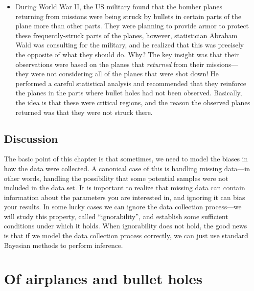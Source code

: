 \documentclass[12pt]{article}
\begin{document}
\begin{itemize}
\item During World War II, the US military found that the bomber planes returning from missions were being struck by bullets in certain parts of the plane more than other parts. They were planning to provide armor to protect these frequently-struck parts of the planes, however, statistician Abraham Wald was consulting for the military, and he realized that this was precisely the opposite of what they should do. Why? The key insight was that their observations were based on the planes that \textit{returned} from their missions---they were not considering all of the planes that were shot down! He performed a careful statistical analysis and recommended that they reinforce the planes in the parts where bullet holes had not been observed. Basically, the idea is that these were critical regions, and the reason the observed planes returned was that they were not struck there.
\end{itemize}




\subsection{Discussion}

The basic point of this chapter is that sometimes, we need to model the biases in how the data were collected. A canonical case of this is handling missing data---in other words, handling the possibility that some potential samples were not included in the data set. It is important to realize that missing data can contain information about the parameters you are interested in, and ignoring it can bias your results. In some lucky cases we can ignore the data collection process---we will study this property, called ``ignorability'', and establish some sufficient conditions under which it holds. When ignorability does not hold, the good news is that if we model the data collection process correctly, we can just use standard Bayesian methods to perform inference.


\section{Of airplanes and bullet holes}
\end{document}
